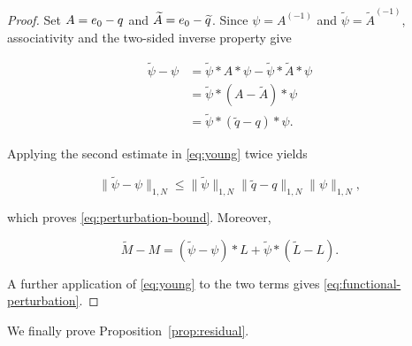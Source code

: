 \documentclass[3p,12pt,authoryear]{elsarticle}
\theoremstyle{definition}
\theoremstyle{remark}
\newcommand{\ez}{e_{\mathstrut 0}}
\begin{document}
\begin{proof}
Set $A=\ez-q$ and $\widetilde A=\ez-\widetilde q$. Since $\psi=A^{(-1)}$ and $\widetilde\psi=\widetilde A^{(-1)}$, associativity and the two-sided inverse property give

\begin{equation*}
\begin{aligned}
\widetilde\psi-\psi
&=\widetilde\psi*A*\psi-\widetilde\psi*\widetilde A*\psi\\
&=\widetilde\psi*(A-\widetilde A)*\psi\\
&=\widetilde\psi*(\widetilde q-q)*\psi.
\end{aligned}
\end{equation*}

Applying the second estimate in \eqref{eq:young} twice yields

\begin{equation*}
\|\widetilde\psi-\psi\|_{1,N}
\leq
\|\widetilde\psi\|_{1,N}
\|\widetilde q-q\|_{1,N}
\|\psi\|_{1,N},
\end{equation*}

which proves \eqref{eq:perturbation-bound}. Moreover,

\begin{equation*}
\widetilde M-M
=(\widetilde\psi-\psi)*L+\widetilde\psi*(\widetilde L-L).
\end{equation*}

A further application of \eqref{eq:young} to the two terms gives \eqref{eq:functional-perturbation}.
\end{proof}

We finally prove Proposition~\ref{prop:residual}.
\end{document}

